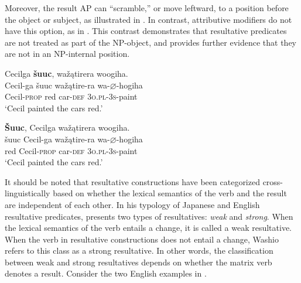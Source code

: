 \documentclass[output=paper]{LSP/langsci}
\begin{document}
Moreover, the result AP can ``scramble,'' or move leftward, to a position before the object or subject, as illustrated in . In contrast, attributive modifiers do not have this option, as in . This contrast demonstrates that resultative predicates are not treated as part of the NP-object, and provides further evidence that they are not in an NP-internal position.

\begin{exe}
\ex
\begin{xlist}

\ex \glll Cecilga \textbf{šuuc}, wažątirera woogiha. \\
 Cecil-ga šuuc  wažątire-ra wa-{$\varnothing$}-hogiha\\
 Cecil-\textsc{prop} red car-\textsc{def} \textsc{3o.pl}-\textsc{3s}-paint \\
\glt `Cecil painted the cars red.'

\ex \glll \textbf{\v{S}uuc}, Cecilga wažątirera woogiha. \\
  šuuc Cecil-ga wažątire-ra wa-{$\varnothing$}-hogiha\\
red Cecil-\textsc{prop} car-\textsc{def} \textsc{3o.pl}-\textsc{3s}-paint \\
\glt `Cecil painted the cars red.'

\end{xlist}




\end{exe}

It should be noted that resultative constructions have been categorized cross-linguistically based on whether the lexical semantics of the verb and the result are independent of each other. In his typology of Japanese and English resultative predicates, \citet{Washio1997} presents two types of resultatives: \textit{weak} and \textit{strong}. When the lexical semantics of the verb entails a change, it is called a weak resultative. When the verb in resultative constructions does not entail a change, Washio refers to this class as a strong resultative. In other words, the classification between weak and strong resultatives depends on whether the matrix verb denotes a result. Consider the two English examples in .
\end{document}
